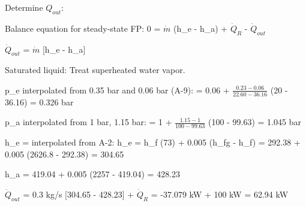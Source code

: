 Determine \( Q_{out} \):  

Balance equation for steady-state FP:  
0 = \( \dot{m} \) (h_e - h_a) + \( \dot{Q}_R \) - \( \dot{Q}_{out} \)  

\( \dot{Q}_{out} \) = \( \dot{m} \) [h_e - h_a]  

Saturated liquid: Treat superheated water vapor.  

p_e interpolated from 0.35 bar and 0.06 bar (A-9):  
= 0.06 + \( \frac{0.23 - 0.06}{22.60 - 36.16} \) (20 - 36.16)  
= 0.326 bar  

p_a interpolated from 1 bar, 1.15 bar:  
= 1 + \( \frac{1.15 - 1}{100 - 99.63} \) (100 - 99.63)  
= 1.045 bar  

h_e = interpolated from A-2:  
h_e = h_f (73) + 0.005 (h_fg - h_f)  
= 292.38 + 0.005 (2626.8 - 292.38)  
= 304.65  

h_a = 419.04 + 0.005 (2257 - 419.04)  
= 428.23  

\( \dot{Q}_{out} \) = 0.3 kg/s [304.65 - 428.23] + \( \dot{Q}_R \)  
= -37.079 kW + 100 kW  
= 62.94 kW